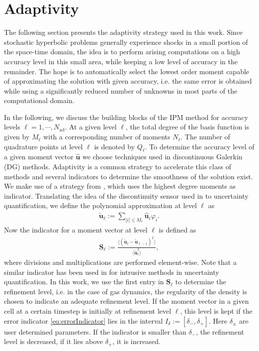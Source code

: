 \section{Adaptivity}
\label{sec:adaptivity}

The following section presents the adaptivity strategy used in this work. Since stochastic hyperbolic problems generally experience shocks in a small portion of the space-time domain, the idea is to perform arising computations on a high accuracy level in this small area, while keeping a low level of accuracy in the remainder. The hope is to automatically select the lowest order moment capable of approximating the solution with given accuracy, i.e. the same error is obtained while using a significantly reduced number of unknowns in most parts of the computational domain.

In the following, we discuss the building blocks of the IPM method for accuracy levels $\ell = 1,\cdots,N_{\text{ad}}$. At a given level $\ell$, the total degree of the basis function is given by $M_{\ell}$ with a corresponding number of moments $N_{\ell}$. The number of quadrature points at level $\ell$ is denoted by $Q_{\ell}$. To determine the accuracy level of a given moment vector $\bm{\hat u}$ we choose techniques used in discontinuous Galerkin (DG) methods. Adaptivity is a common strategy to accelerate this class of methods and several indicators to determine the smoothness of the solution exist. We make use of a strategy from \cite{persson2006sub}, which uses the highest degree moments as indicator. Translating the idea of the discontinuity sensor used in \cite{persson2006sub} to uncertainty quantification, we define the polynomial approximation at level $\ell$ as
\begin{align*}
\bm{\tilde u}_{\ell} := \sum_{|i|\leq M_{\ell}} \bm{\hat{u}}_i \varphi_i.
\end{align*}
Now the indicator for a moment vector at level $\ell$ is defined as
\begin{align}\label{eq:errorIndicator}
\bm S_{\ell} := \frac{\langle \left(\bm{\tilde u}_{\ell} - \bm{\tilde u}_{\ell-1}\right)^2\rangle}{\langle \bm{\tilde u}_{\ell}^2\rangle},
\end{align}
where divisions and multiplications are performed element-wise. Note that a similar indicator has been used in \cite{kroker2012finite} for intrusive methods in uncertainty quantification. In this work, we use the first entry in $\bm S_{\ell}$ to determine the refinement level, i.e. in the case of gas dynamics, the regularity of the density is chosen to indicate an adequate refinement level. If the moment vector in a given cell at a certain timestep is initially at refinement level $\ell$, this level is kept if the error indicator \eqref{eq:errorIndicator} lies in the interval $I_{\delta}:=[\delta_{-},\delta_{+}]$. Here $\delta_{\pm}$ are user determined parameters. If the indicator is smaller than $\delta_-$, the refinement level is decreased, if it lies above $\delta_+$, it is increased.

